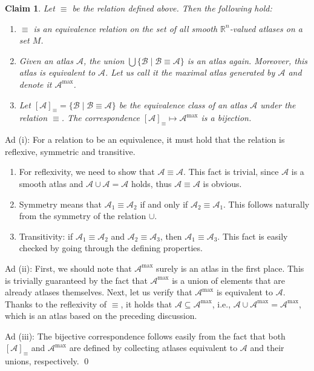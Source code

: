 \documentclass[11pt,a4paper,twoside,openany]{report}
\theoremstyle{my-theorem}
\newtheorem{claim}[theorem]{Claim}
\theoremstyle{non-theorem}
\renewenvironment{proof}[1][\proofname]{{\scshape #1. }}{\qed}
\begin{document}
		\begin{claim}
			Let $\equiv$ be the relation defined above. Then the following hold:
			\begin{enumerate}[label=\rm(\roman*)]
				\item $\equiv$ is an equivalence relation on the set of all smooth $\mathbb R^n$-valued atlases on a set $M$.
				\item Given an atlas $\mathcal A$, the union $\bigcup \{\mathcal B \mid \mathcal B \equiv \mathcal A\}$ is an atlas again. Moreover, this atlas is equivalent to $\mathcal A$. Let us call it the \emph{maximal atlas} generated by $\mathcal A$ and denote it $\mathcal A^{\mathrm{max}}$.
				\item Let $[\mathcal A]_\equiv = \{\mathcal B \mid \mathcal B \equiv \mathcal A\}$ be the equivalence class of an atlas $\mathcal A$ under the relation $\equiv$. The correspondence $[\mathcal A]_\equiv \mapsto \mathcal A^{\mathrm{max}}$ is a bijection.
			\end{enumerate}
		\end{claim}
		
		\begin{proof}
			Ad (i): For a relation to be an equivalence, it must hold that the relation is reflexive, symmetric and transitive.
			\begin{enumerate}[label=\rm(\alph*)]
				\item For reflexivity, we need to show that $\mathcal A \equiv \mathcal A$. This fact is trivial, since $\mathcal A$ is a smooth atlas and $\mathcal A \cup \mathcal A = \mathcal A$ holds, thus $\mathcal A \equiv \mathcal A$ is obvious.
				\item Symmetry means that $\mathcal A_1 \equiv \mathcal A_2$ if and only if $\mathcal A_2 \equiv \mathcal A_1$. This follows naturally from the symmetry of the relation $\cup$.
				\item Transitivity: if $\mathcal A_1 \equiv \mathcal A_2$ and $\mathcal A_2 \equiv \mathcal A_3$, then $\mathcal A_1 \equiv \mathcal A_3$. This fact is easily checked by going through the defining properties.
			\end{enumerate}
		
			Ad (ii): First, we should note that $\mathcal A^{\mathrm{max}}$ surely is an atlas in the first place. This is trivially guaranteed by the fact that $\mathcal A^{\mathrm{max}}$ is a union of elements that are already atlases themselves. Next, let us verify that $\mathcal A^{\mathrm{max}}$ is equivalent to $\mathcal A$. Thanks to the reflexivity of $\equiv$, it holds that $\mathcal A \subseteq \mathcal A^{\mathrm{max}}$, i.e., $\mathcal A \cup \mathcal A^{\mathrm{max}} = \mathcal A^{\mathrm{max}}$, which is an atlas based on the preceding discussion.
			
			Ad (iii): The bijective correspondence follows easily from the fact that both $[\mathcal A]_\equiv$ and $\mathcal A^{\mathrm{max}}$ are defined by collecting atlases equivalent to $\mathcal A$ and their unions, respectively.
		\end{proof}
	
\end{document}
